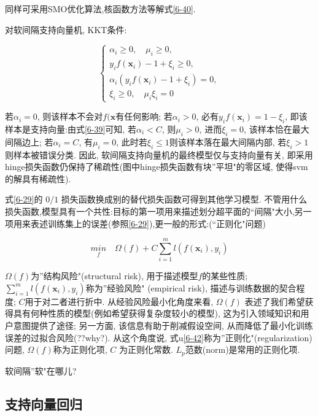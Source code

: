\documentclass[12pt]{article}
\numberwithin{equation}{section}%
\begin{document}
同样可采用SMO优化算法,核函数方法等解式\ref{6-40}.

对软间隔支持向量机, KKT条件:

\begin{equation}
 \left\{ \begin{array}{ll||}
 \alpha_{i} \geqslant 0, \quad \mu_{i} \geqslant 0 , \\
 y_{i}f(\boldsymbol{x}_{i}) - 1 + \xi_{i} \geqslant 0 ,  \\
 \alpha_{i}(y_{i}f(\boldsymbol{x}_{i}) - 1 + \xi_{i}) = 0, \\
 \xi_{i} \geqslant 0, \quad \mu_{i}\xi_{i} = 0  
 \end{array}  \right.
\end{equation}

若$\alpha_{i} = 0$, 则该样本不会对$f(\boldsymbol{x}$有任何影响; 若$\alpha_{i} > 0$, 必有$y_{i}f(\boldsymbol{x}_{i}) = 1 - \xi_{i}$, 即该样本是{\color{red}支持向量:}由式\ref{6-39}可知, 若$\alpha_{i} < C$, 则$\mu_{i} > 0$, 进而$\xi_{i} = 0$, 该样本恰在最大间隔边上; 若$\alpha_{i} = C$, 有$\mu_{i} = 0$, 此时若$\xi_{i} \leqslant 1$则该样本落在最大间隔内部, 若$\xi_{i} > 1$则样本被错误分类. 因此, 软间隔支持向量机的最终模型仅与支持向量有关, 即采用hinge损失函数仍保持了稀疏性(图中hinge损失函数有块''平坦"的零区域, 使得svm的解具有稀疏性).

式\ref{6-29}的 $0/1$ 损失函数换成别的替代损失函数可得到其他学习模型. 不管用什么损失函数,模型具有一个共性:目标的第一项用来描述划分超平面的``间隔"大小,另一项用来表述训练集上的误差(参照\ref{6-29}),更一般的形式:(``正则化"问题)

\begin{equation}
{\underset{f}{min}} \quad \Omega(f)+C\sum_{i=1}^{m}l(f(\boldsymbol{x}_{i}),y_{i}) 
\label{6-42}
\end{equation}

$\Omega(f)$为''结构风险"(structural risk), 用于描述模型$f$的某些性质; $\sum_{i=1}^{m}l(f(\boldsymbol{x}_{i}),y_{i})$称为''经验风险" (empirical risk), 描述与训练数据的契合程度; $C$用于对二者进行折中. 从经验风险最小化角度来看, $\Omega(f)$ 表述了我们希望获得具有何种性质的模型(例如希望获得复杂度较小的模型), 这为引入领域知识和用户意图提供了途径; 另一方面, 该信息有助于削减假设空间, 从而降低了最小化训练误差的过拟合风险(??why?). 从这个角度说, 式u\ref{6-42}称为''正则化"(regularization)问题, $\Omega(f)$称为正则化项, $C$ 为正则化常数. $L_{p}$范数(norm)是常用的正则化项.

软间隔''软"在哪儿?

\subsection{支持向量回归}
\end{document}
